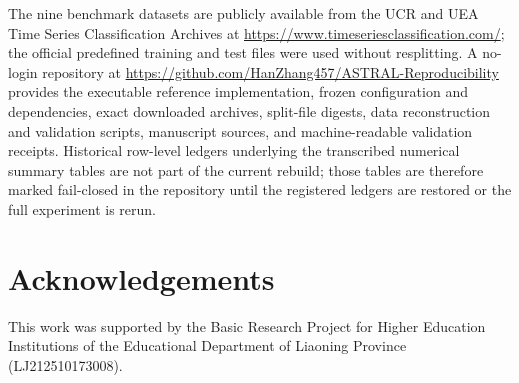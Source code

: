 \documentclass[pdflatex,sn-mathphys-num]{sn-jnl}
\newcommand{\1}{\mathbf{1}}
\theoremstyle{plain}
\begin{document}
The nine benchmark datasets are publicly available from the UCR and UEA Time Series Classification Archives at \url{https://www.timeseriesclassification.com/}; the official predefined training and test files were used without resplitting. A no-login repository at \url{https://github.com/HanZhang457/ASTRAL-Reproducibility} provides the executable reference implementation, frozen configuration and dependencies, exact downloaded archives, split-file digests, data reconstruction and validation scripts, manuscript sources, and machine-readable validation receipts. Historical row-level ledgers underlying the transcribed numerical summary tables are not part of the current rebuild; those tables are therefore marked fail-closed in the repository until the registered ledgers are restored or the full experiment is rerun.

\section*{Acknowledgements}

This work was supported by the Basic Research Project for Higher Education Institutions of the Educational Department of Liaoning Province (LJ212510173008).


\end{document}

